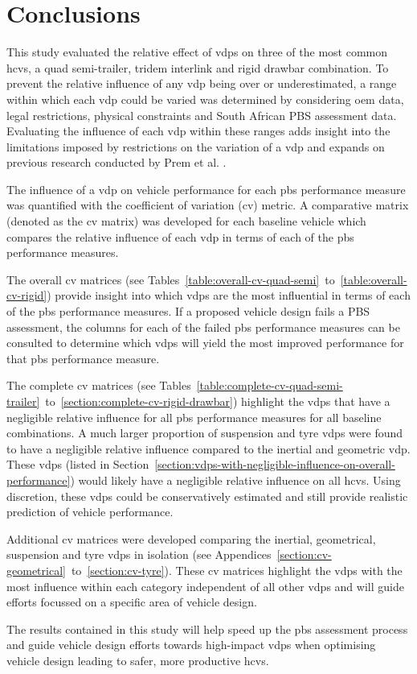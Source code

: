 \chapter{Conclusions}\label{Conclusions} 

This study evaluated the relative effect of \glspl{vdp} on three of the most common \glspl{hcv}, a quad semi-trailer, tridem interlink and rigid drawbar combination. To prevent the relative influence of any \gls{vdp} being over or underestimated, a range within which each \gls{vdp} could be varied was determined by considering \gls{oem} data, legal restrictions, physical constraints and South African PBS assessment data. Evaluating the influence of each \gls{vdp} within these ranges adds insight into the limitations imposed by restrictions on the variation of a \gls{vdp} and expands on previous research conducted by Prem et al. \cite{Prem2002}.

The influence of a \gls{vdp} on vehicle performance for each \gls{pbs} performance measure was quantified with the coefficient of variation (\gls{cv}) metric. A comparative matrix (denoted as the \gls{cv} matrix) was developed for each baseline vehicle which compares the relative influence of each \gls{vdp} in terms of each of the \gls{pbs} performance measures. 

The overall \gls{cv} matrices (see Tables~\ref{table:overall-cv-quad-semi}~to~\ref{table:overall-cv-rigid}) provide insight into which \glspl{vdp} are the most influential in terms of each of the \gls{pbs} performance measures. If a proposed vehicle design fails a PBS assessment, the columns for each of the failed \gls{pbs} performance measures can be consulted to determine which \glspl{vdp} will yield the most improved performance for that \gls{pbs} performance measure.

The complete \gls{cv} matrices (see Tables~\ref{table:complete-cv-quad-semi-trailer}~to~\ref{section:complete-cv-rigid-drawbar}) highlight the \glspl{vdp} that have a negligible relative influence for all \gls{pbs} performance measures for all baseline combinations. A much larger proportion of suspension and tyre \glspl{vdp} were found to have a negligible relative influence compared to the inertial and geometric \gls{vdp}. These \glspl{vdp} (listed in Section~\ref{section:vdps-with-negligible-influence-on-overall-performance}) would likely have a negligible relative influence on all \glspl{hcv}. Using discretion, these \glspl{vdp} could be conservatively estimated and still provide realistic prediction of vehicle performance.

Additional \gls{cv} matrices were developed comparing the inertial, geometrical, suspension and tyre \glspl{vdp} in isolation (see Appendices~\ref{section:cv-geometrical}~to~\ref{section:cv-tyre}). These \gls{cv} matrices highlight the \glspl{vdp} with the most influence within each category independent of all other \glspl{vdp} and will guide efforts focussed on a specific area of vehicle design.
 
The results contained in this study will help speed up the \gls{pbs} assessment process and guide vehicle design efforts towards high-impact \glspl{vdp} when optimising vehicle design leading to safer, more productive \glspl{hcv}.